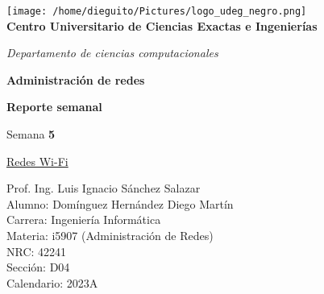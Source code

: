\usepackage{graphicx}


\begin{titlepage}
\begin{center}
	\texttt{[image: /home/dieguito/Pictures/logo\_udeg\_negro.png]}\\
	\vspace{1cm}
{\Large 	\textbf{Centro Universitario de Ciencias Exactas e Ingenierías}\\}

\vspace{0.5cm}
	
{\large 	\textit{Departamento de ciencias computacionales}\\}
	
	\vspace{1cm}
	
	\textbf{Administración de redes}\\
	
	\vspace{0.5cm}
	
	\textbf{Reporte semanal}\\
	
	\vspace{0.5cm}
	
	Semana \textbf{5}
	
	\vspace{0.5cm}
	
	\underline{Redes Wi-Fi}\\
	
	\vspace{1cm}
	
	Prof. Ing. Luis Ignacio Sánchez Salazar\\
	
	Alumno: Domínguez Hernández Diego Martín\\
	
	Carrera: Ingeniería Informática \\
	
	Materia: i5907 (Administración de Redes)\\
	
	NRC: 42241\\
	
	Sección: D04\\

	Calendario: 2023A\\
	
\end{center}
\end{titlepage}
